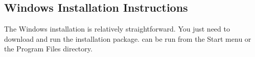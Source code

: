\subsection{Windows Installation Instructions}
\label{sec:windows-install}

The Windows installation is relatively straightforward.  You just need
to download and run the \map{} installation package.  \map{} can be run
from the Start menu or the Program Files directory.

